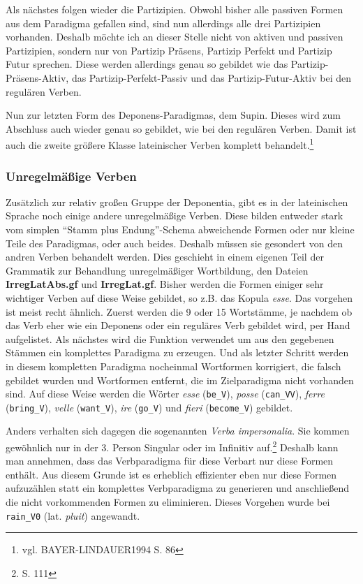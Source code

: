 \documentclass[12pt,abstract=on,titlepage,bibliography=totoc,ngerman,listof=totoc]{scrreprt}
\begin{document}
Als nächstes folgen wieder die Partizipien. Obwohl bisher alle passiven Formen aus dem Paradigma gefallen sind, sind nun allerdings alle drei Partizipien vorhanden. Deshalb möchte ich an dieser Stelle nicht von aktiven und passiven Partizipien, sondern nur von Partizip Präsens, Partizip Perfekt und Partizip Futur sprechen. Diese werden allerdings genau so gebildet wie das Partizip-Präsens-Aktiv, das Partizip-Perfekt-Passiv und das Partizip-Futur-Aktiv bei den regulären Verben. \par
Nun zur letzten Form des Deponens-Paradigmas, dem Supin. Dieses wird zum Abschluss auch wieder genau so gebildet, wie bei den regulären Verben. Damit ist auch die zweite größere Klasse lateinischer Verben komplett behandelt.\footnote{vgl. BAYER-LINDAUER1994 S. 86} \par
\subsubsection{Unregelmäßige Verben}
Zusätzlich zur relativ großen Gruppe der Deponentia, gibt es in der lateinischen Sprache noch einige andere unregelmäßige Verben. Diese bilden entweder stark vom simplen ``Stamm plus Endung''-Schema abweichende Formen oder nur kleine Teile des Paradigmas, oder auch beides. Deshalb müssen sie gesondert von den andren Verben behandelt werden. Dies geschieht in einem eigenen Teil der Grammatik zur Behandlung unregelmäßiger Wortbildung, den Dateien \textbf{IrregLatAbs.gf} und \textbf{IrregLat.gf}. Bisher werden die Formen einiger sehr wichtiger Verben auf diese Weise gebildet, so z.B. das Kopula \textit{esse}. Das vorgehen ist meist recht ähnlich. Zuerst werden die 9 oder 15 Wortstämme, je nachdem ob das Verb eher wie ein Deponens oder ein reguläres Verb gebildet wird, per Hand aufgelistet. Als nächstes wird die Funktion verwendet um aus den gegebenen Stämmen ein komplettes Paradigma zu erzeugen. Und als letzter Schritt werden in diesem kompletten Paradigma nocheinmal Wortformen korrigiert, die falsch gebildet wurden und Wortformen entfernt, die im Zielparadigma nicht vorhanden sind. Auf diese Weise werden die Wörter \textit{esse} (\texttt{be\_V}), \textit{posse} (\texttt{can\_VV}), \textit{ferre} (\texttt{bring\_V}), \textit{velle} (\texttt{want\_V}), \textit{ire} (\texttt{go\_V}) und \textit{fieri} (\texttt{become\_V}) gebildet. \par
Anders verhalten sich dagegen die sogenannten \textit{Verba impersonalia}. Sie kommen gewöhnlich nur in der 3. Person Singular oder im Infinitiv auf.\footnote{\cite{BAYER-LINDAUER1994} S. 111} Deshalb kann man annehmen, dass das Verbparadigma für diese Verbart nur diese Formen enthält. Aus diesem Grunde ist es erheblich effizienter eben nur diese Formen aufzuzählen statt ein komplettes Verbparadigma zu generieren und anschließend die nicht vorkommenden Formen zu eliminieren. Dieses Vorgehen wurde bei \texttt{rain\_V0} (lat. \textit{pluit}) angewandt.
\end{document}
